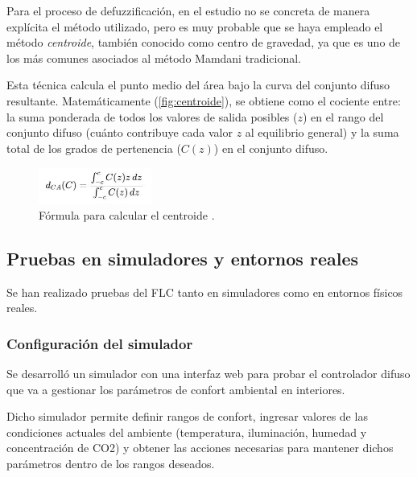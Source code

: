 Para el proceso de defuzzificación, en el estudio no se concreta de manera explícita el método utilizado, pero es muy probable que se haya empleado el método \textit{centroide}, también conocido como centro de gravedad, ya que es uno de los más comunes asociados al método Mamdani tradicional. 

Esta técnica calcula el punto medio del área bajo la curva del conjunto difuso resultante. Matemáticamente (\autoref{fig:centroide}), se obtiene como el cociente entre: la suma ponderada de todos los valores de salida posibles ($z$) en el rango del conjunto difuso (cuánto contribuye cada valor $z$ al equilibrio general) y la suma total de los grados de pertenencia ($C(z)$) en el conjunto difuso.

\begin{figure}[H]
	\centering
	\includegraphics[width=0.33\textwidth]{imgs/centroide.JPG}
	\caption{Fórmula para calcular el centroide \parencite{klir1996fuzzy}.}
	\label{fig:centroide}
\end{figure}

\subsection{Pruebas en simuladores y entornos reales}

Se han realizado pruebas del FLC tanto en simuladores como en entornos físicos reales.

\subsubsection{Configuración del simulador}

Se desarrolló un simulador con una interfaz web para probar el controlador difuso que va a gestionar los parámetros de confort ambiental en interiores.

Dicho simulador permite definir rangos de confort, ingresar valores de las condiciones actuales del ambiente (temperatura, iluminación, humedad y concentración de CO2) y obtener las acciones necesarias para mantener dichos parámetros dentro de los rangos deseados.

